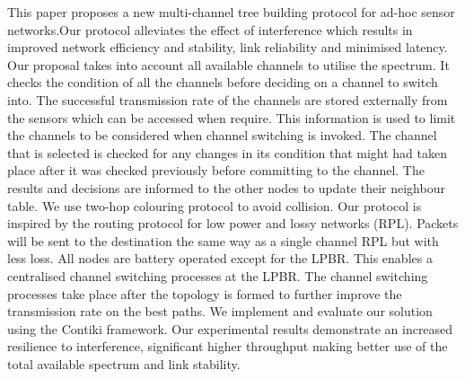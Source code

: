This paper proposes a new multi-channel tree building protocol for ad-hoc sensor networks.Our protocol alleviates the effect of interference which results in improved network efficiency and stability, link reliability and minimised latency. 
        Our proposal takes into account all available channels to utilise the spectrum. It checks the condition of all the channels before deciding on a channel to switch into. The successful transmission rate of the channels are stored externally from the sensors which can be accessed when require. This information is used to limit the channels to be considered when channel switching is invoked. The channel that is selected is checked for any changes in its condition that might had taken place after it was checked previously before committing to the channel. The results and decisions are informed to the other nodes to update their neighbour table. We use two-hop colouring protocol to avoid collision. 
	Our protocol is inspired by the routing protocol for low power and lossy networks (RPL). Packets will be sent to the destination the same way as a single channel RPL but with less loss. 
	All nodes are battery operated except for the LPBR. This enables a centralised channel switching processes at the LPBR. The channel switching processes take place after the topology is formed to further improve the transmission rate on the best paths.
	We implement and evaluate our solution using the Contiki framework. Our experimental results demonstrate an increased resilience to interference, significant higher throughput making better use of the total available spectrum and link stability. 
